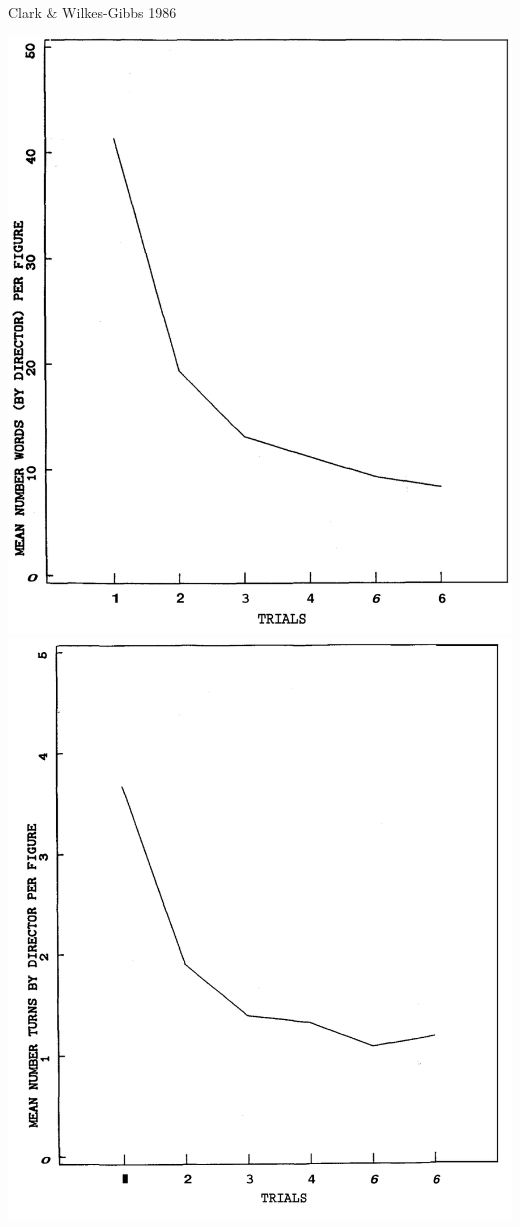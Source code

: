 \documentclass[ 12pt, xcolor=beamer,table,usenames,dvipsnames, ignorenonframetext, ngerman]{beamer}
\begin{document}
\begin{frame}{Clark \& Wilkes-Gibbs 1986}
	
	\includegraphics[width=.48\textwidth]{../images/clark_words.png}
	\includegraphics[width=.5\textwidth]{../images/clark_turns.png}	
	
\end{frame}

%
%	
%	
%	
\end{document}

